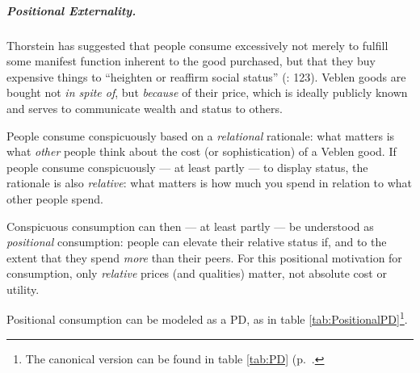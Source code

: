 \subparagraph{Positional Externality.}  \label{sec:positionalrace} Thorstein \cite{Veblen1899} has suggested that people consume excessively not merely to fulfill some manifest function inherent to the good purchased, but that they buy expensive things to ``heighten or reaffirm social status'' (\citealt{Merton-1968-aa}: 123). Veblen goods are bought not \emph{in spite of}, but \emph{because} of their price, which is ideally publicly known and serves to communicate wealth and status to others.

People consume conspicuously based on a \emph{relational} rationale: what matters is what \emph{other} people think about the cost (or sophistication) of a Veblen good. If people consume conspicuously --- at least partly --- to display status, the rationale is also \emph{relative}: what matters is how much you spend in relation to what other people spend.

Conspicuous consumption can then --- at least partly --- be understood as \emph{positional} consumption: people can elevate their relative status if, and to the extent that they spend \emph{more} than their peers. For this positional motivation for consumption, only \emph{relative} prices (and qualities) matter, not absolute cost or utility.

Positional consumption can be modeled as a \gls{PD}, as in table \ref{tab:PositionalPD}\footnote{
	The canonical version can be found in table \ref{tab:PD} (p.~\pageref{tab:PD}.}.

